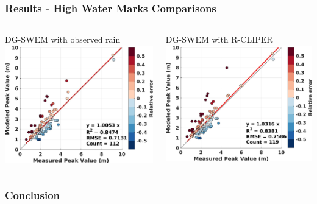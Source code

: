 \documentclass[10pt]{oden_beamer}
\begin{document}
\begin{frame}
  \frametitle{Results - High Water Marks Comparisons}
  \begin{columns}
    \centering
    \vspace{0.5cm}
    \centering
    DG-SWEM with observed rain
    \includegraphics[width=\linewidth]{2008_owi.jpg}

    \centering
    \vspace{0.5cm}
    \centering
    DG-SWEM with R-CLIPER
    \includegraphics[width=\linewidth]{2008_rain.jpg}

  \end{columns}
\end{frame}
\begin{frame}
  \frametitle{Conclusion}
\end{frame}
\end{document}
